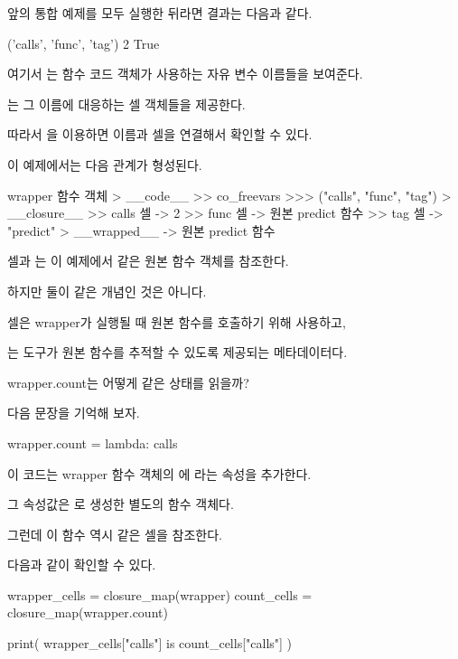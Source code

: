 앞의 통합 예제를 모두 실행한 뒤라면 결과는 다음과 같다.

\begin{dhkzsh}
('calls', 'func', 'tag')
2
True
\end{dhkzsh}

여기서 는 함수 코드 객체가 사용하는 자유 변수 이름들을 보여준다.

는 그 이름에 대응하는 셀 객체들을 제공한다.

따라서 을 이용하면 이름과 셀을 연결해서 확인할 수 있다.

이 예제에서는 다음 관계가 형성된다.

\begin{dhkdir}[in=6]
wrapper 함수 객체
> __code__
>> co_freevars
>>> ("calls", "func", "tag")
> __closure__
>> calls 셀 -> 2
>> func 셀 -> 원본 predict 함수
>> tag 셀 -> "predict"
> __wrapped__ -> 원본 predict 함수
\end{dhkdir}

 셀과 는 이 예제에서 같은 원본 함수 객체를 참조한다.

하지만 둘이 같은 개념인 것은 아니다.

 셀은 wrapper가 실행될 때 원본 함수를 호출하기 위해 사용하고,

는 도구가 원본 함수를 추적할 수 있도록 제공되는 메타데이터다.

\begin{dhknote}
\begin{dhksmry}[centered]
wrapper.count는 어떻게 같은 상태를 읽을까?
\end{dhksmry}
\end{dhknote}

다음 문장을 기억해 보자.

\begin{dhkcode}
wrapper.count = lambda: calls
\end{dhkcode}

이 코드는 wrapper 함수 객체의 에  라는 속성을 추가한다.

그 속성값은 로 생성한 별도의 함수 객체다.

그런데 이 함수 역시 같은  셀을 참조한다.

다음과 같이 확인할 수 있다.

\begin{dhkcode}
wrapper_cells = closure_map(wrapper)
count_cells = closure_map(wrapper.count)

print(
    wrapper_cells["calls"]
    is count_cells["calls"]
)
\end{dhkcode}


